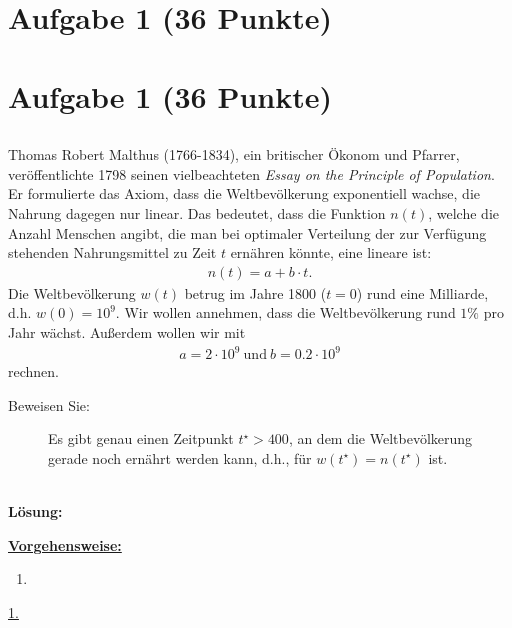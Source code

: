 \vspace{1cm}
\renewcommand{\labelenumi}{\theenumi.}
\section*{Aufgabe 1 (36 Punkte)}
\vspace{0.4cm}
\section*{Aufgabe 1 (36 Punkte)}
\vspace{0.4cm}
\subsection*{} 
Thomas Robert Malthus (1766-1834), ein britischer Ökonom und Pfarrer, veröffentlichte
1798 seinen vielbeachteten \textit{Essay on the Principle of Population}.
Er formulierte das Axiom, dass die Weltbevölkerung exponentiell wachse, die Nahrung dagegen nur linear. 
Das bedeutet, dass die Funktion $ n(t) $, welche die Anzahl Menschen angibt, die man bei optimaler Verteilung der zur Verfügung stehenden Nahrungsmittel zu Zeit $ t $ ernähren könnte, eine lineare ist:
\begin{align*}
	n(t) = a + b \cdot t.
\end{align*}
Die Weltbevölkerung $ w(t) $ betrug im Jahre 1800 ($ t= 0 $) rund eine Milliarde, d.h. $ w(0) = 10^9 $.
Wir wollen annehmen, dass die Weltbevölkerung rund $ 1\% $ pro Jahr wächst.
Außerdem wollen wir mit
\begin{align*}
	a = 2 \cdot 10^9 \ \textrm{und} \ b = 0.2 \cdot 10^9
\end{align*}
rechnen.
\begin{description}
	\item[Beweisen Sie:] 
	Es gibt genau einen Zeitpunkt $ t^\star > 400 $, an dem die Weltbevölkerung gerade noch ernährt werden kann, d.h., für $ w(t^\star)  = n(t^\star )$ ist.
\end{description}  
\
\\
\textbf{Lösung:}
\begin{mdframed}
\underline{\textbf{Vorgehensweise:}}
\renewcommand{\labelenumi}{\theenumi.}
\begin{enumerate}
\item 

\end{enumerate}
\end{mdframed}
\underline{1. }\\

